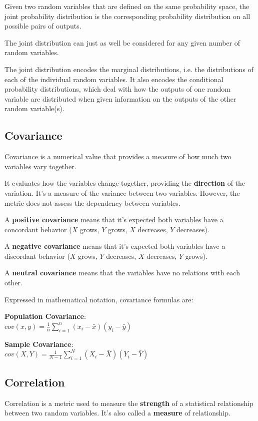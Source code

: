 \documentclass{article}
\begin{document}
Given two random variables that are defined on the same probability space, the joint probability distribution is the corresponding probability distribution on all possible pairs of outputs. 

The joint distribution can just as well be considered for any given number of random variables. 

The joint distribution encodes the marginal distributions, i.e. the distributions of each of the individual random variables. It also encodes the conditional probability distributions, which deal with how the outputs of one random variable are distributed when given information on the outputs of the other random variable(s).

\subsection{Covariance}
Covariance is a numerical value that provides a measure of how much two variables vary together.

It evaluates how the variables change together, providing the \textbf{direction} of the variation. 
It’s a measure of the variance between two variables. However, the metric does not assess the dependency between variables.

A \textbf{positive covariance} means that it’s expected both variables have a concordant behavior ($X$ grows, $Y$ grows, $X$ decreases, $Y$ decreases).

A \textbf{negative covariance} means that it’s expected both variables have a discordant behavior 
($X$ grows, $Y$ decreases, $X$ decreases, $Y$ grows).

A \textbf{neutral covariance} means that the variables have no relations with each other.

Expressed in mathematical notation, covariance formulas are:

\textbf{Population Covariance}: \\ 
$\displaystyle cov(x, y) = \frac{1}{n}\sum \limits_{i=1}^n (x_i - \bar{x})(y_i - \bar{y})$

\textbf{Sample Covariance}: \\ 
$\displaystyle cov(X, Y) = \frac{1}{N-1}\sum \limits_{i=1}^N (X_i - \bar{X})(Y_i - \bar{Y})$

\subsection{Correlation}
Correlation is a metric used to measure the \textbf{strength} of a  statistical relationship between two random variables. It’s also called a \textbf{measure} of relationship.
\end{document}
